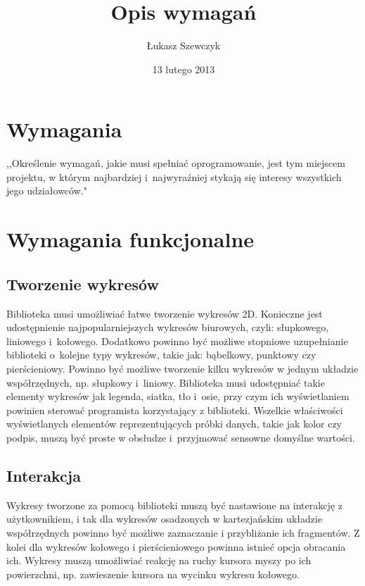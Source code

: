 \documentclass[11pt,twoside,a4paper,final]{llncs}
\begin{document}
\date{13 lutego 2013}
\title{Opis wymagań}

\author{Łukasz Szewczyk}
\maketitle

\section{Wymagania}
,,Określenie wymagań, jakie musi spełniać oprogramowanie, jest tym miejscem projektu, w którym najbardziej i~najwyraźniej stykają się interesy wszystkich jego udziałowców."~\cite{sacha-wymagania}

\section{Wymagania funkcjonalne}

\subsection{Tworzenie wykresów}
Biblioteka musi umożliwiać łatwe tworzenie wykresów 2D. Konieczne jest udostępnienie najpopularniejszych wykresów biurowych, czyli: słupkowego, liniowego i~kołowego. Dodatkowo powinno być możliwe stopniowe uzupełnianie biblioteki o~kolejne typy wykresów, takie jak: bąbelkowy, punktowy czy pierścieniowy. Powinno być możliwe tworzenie kilku wykresów w jednym układzie współrzędnych, np. słupkowy i~liniowy.
Biblioteka musi udostępniać takie elementy wykresów jak legenda, siatka, tło i~osie, przy czym ich wyświetlaniem powinien sterować programista korzystający z biblioteki. Wszelkie właściwości wyświetlanych elementów reprezentujących próbki danych, takie jak kolor czy podpis, muszą być proste w obsłudze i~przyjmować sensowne domyślne wartości.

\subsection{Interakcja}
Wykresy tworzone za pomocą biblioteki muszą być nastawione na interakcję z użytkownikiem, i tak dla wykresów osadzonych w kartezjańskim układzie współrzędnych powinno być możliwe zaznaczanie i przybliżanie ich fragmentów. Z kolei dla wykresów kołowego i pierścieniowego powinna istnieć opcja obracania ich. Wykresy muszą umożliwiać reakcję na ruchy kursora myszy po ich powierzchni, np. zawieszenie kursora na wycinku wykresu kołowego.
\end{document}
